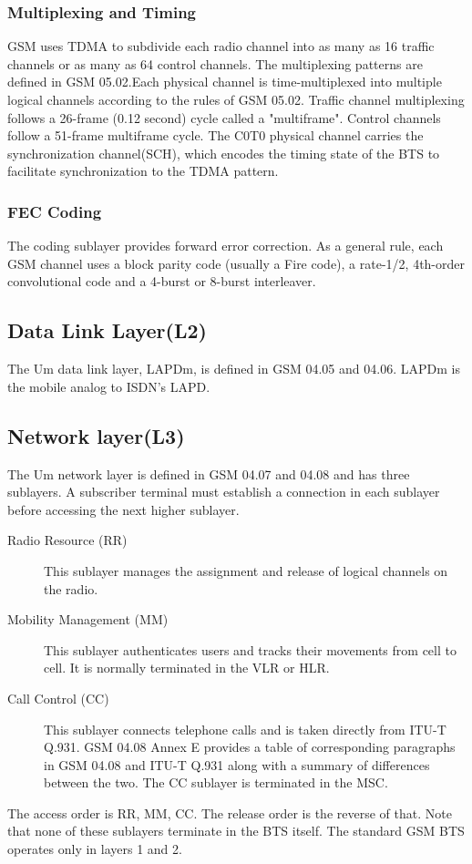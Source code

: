 \subsubsection*{Multiplexing and Timing}
GSM uses TDMA to subdivide each
radio channel into as many as 16 traffic channels or as many as 64 control
channels. The multiplexing patterns are defined in GSM 05.02.Each physical
channel is time-multiplexed into multiple logical channels according to
the rules of GSM 05.02. Traffic channel multiplexing follows a 26-frame
(0.12 second) cycle called a "multiframe". Control channels follow a
51-frame multiframe cycle. The C0T0 physical channel carries the
synchronization channel(SCH), which encodes the timing state of the
BTS to facilitate synchronization to the TDMA pattern.


\subsubsection*{FEC Coding} The coding sublayer provides forward error
correction. As a general rule, each GSM channel uses a block parity code
(usually a Fire code), a rate-1/2, 4th-order convolutional code and a
4-burst or 8-burst interleaver.



\subsection{Data Link Layer(L2)}
The Um data link layer, LAPDm, is defined in GSM 04.05 and 04.06.
LAPDm is the mobile analog to ISDN's LAPD.

\subsection{Network layer(L3)}
The Um network layer is defined in GSM 04.07 and 04.08 and has three sublayers.
A subscriber terminal must establish a connection in each sublayer before
accessing the next higher sublayer.

\begin{description}
\item[Radio Resource (RR)] This sublayer manages the assignment and
release of logical channels on the radio.

\item[Mobility Management (MM)] This sublayer authenticates users and
tracks their movements from cell to cell. It is normally terminated in
the VLR or HLR.

\item[Call Control (CC)] This sublayer connects telephone calls and is
taken directly from ITU-T Q.931. GSM 04.08 Annex E provides a table of
corresponding paragraphs in GSM 04.08 and ITU-T Q.931 along with a summary
of differences between the two. The CC sublayer is terminated in the MSC.

\end{description}

The access order is RR, MM, CC. The release order is the reverse of that.
Note that none of these sublayers terminate in the BTS itself. The standard
GSM BTS operates only in layers 1 and 2.